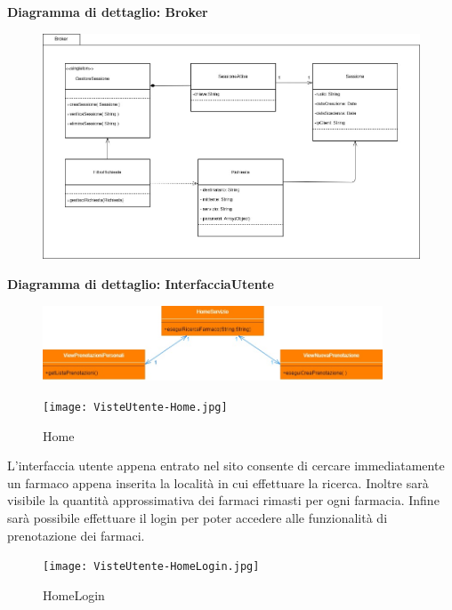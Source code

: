 \newpage

\textbf{Diagramma di dettaglio: Broker}
\begin{figure}[h!]
    \begin{center}
        \includegraphics[width=\textwidth]{immagini/Broker.jpg}
    \end{center}
\end{figure}

\newpage


\textbf{Diagramma di dettaglio: InterfacciaUtente}
\begin{figure}[h!]
    \begin{center}
        \includegraphics[width=0.9\textwidth]{immagini/ViewCliente-progettazione.jpg}
    \end{center}
\end{figure}

\begin{figure}[h!]
    \centering
    \texttt{[image: VisteUtente-Home.jpg]}
    \caption{Home}
\end{figure}
L'interfaccia utente appena entrato nel sito consente di cercare immediatamente
un farmaco appena inserita la località in cui effettuare la ricerca. Inoltre
sarà visibile la quantità approssimativa dei farmaci rimasti per ogni farmacia.
Infine sarà possibile effettuare il login per poter accedere alle funzionalità
di prenotazione dei farmaci.

\newpage

\begin{figure}[h!]
    \centering
    \texttt{[image: VisteUtente-HomeLogin.jpg]}
    \caption{HomeLogin}
\end{figure}

